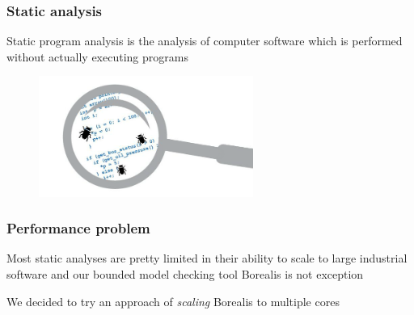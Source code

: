 

\begin{frame}
	\frametitle{Static analysis}

	\begin{block}{}
	\centering
	Static program analysis is the analysis of computer software which is performed without actually executing programs
	\end{block}
		
	\begin{figure}
	\includegraphics[width=70mm]{image/staticAnalysis}
	\end{figure}	
	
\end{frame}



\begin{frame}
	\frametitle{Performance problem}
	\begin{block}{}
		\centering
			Most static analyses are pretty limited in their ability to scale to large industrial software and our bounded model checking tool Borealis is not exception 
	\end{block}

	\begin{block}{}
		\centering
		We decided to try an approach of \textit{scaling} Borealis to multiple cores
	\end{block}
\end{frame}


